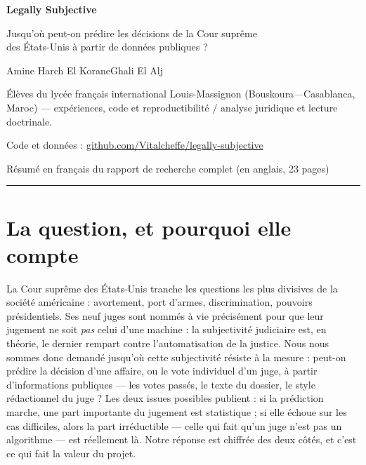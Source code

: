 \documentclass[11pt,a4paper]{article}
\begin{document}
\begin{center}
{\LARGE\bfseries Legally Subjective\par}
\vspace{4pt}
{\large Jusqu'où peut-on prédire les décisions de la Cour suprême\\
des États-Unis à partir de données publiques ?\par}
\vspace{10pt}
{\normalsize Amine Harch El Korane\quad Ghali El Alj\par}
\vspace{2pt}
{\small Élèves du lycée français international Louis-Massignon
(Bouskoura---Casablanca, Maroc) --- expériences, code et reproductibilité /
analyse juridique et lecture doctrinale.\par}
\vspace{2pt}
{\small Code et données : \href{https://github.com/Vitalcheffe/legally-subjective}{github.com/Vitalcheffe/legally-subjective}\par}
\vspace{4pt}
{\small Résumé en français du rapport de recherche complet (en anglais, 23 pages)\par}
\end{center}
\vspace{4pt}

\begin{center}
\rule{0.28\linewidth}{0.6pt}
\end{center}
\vspace{6pt}

\section*{La question, et pourquoi elle compte}

La Cour suprême des États-Unis tranche les questions les plus divisives de la
société américaine : avortement, port d'armes, discrimination, pouvoirs
présidentiels. Ses neuf juges sont nommés à vie précisément pour que leur
jugement ne soit \emph{pas} celui d'une machine : la subjectivité judiciaire
est, en théorie, le dernier rempart contre l'automatisation de la justice.
Nous nous sommes donc demandé jusqu'où cette subjectivité résiste à la
mesure : peut-on prédire la décision d'une affaire, ou le vote individuel
d'un juge, à partir d'informations publiques --- les votes passés, le texte
du dossier, le style rédactionnel du juge ? Les deux issues possibles
publient : si la prédiction marche, une part importante du jugement est
statistique ; si elle échoue sur les cas difficiles, alors la part
irréductible --- celle qui fait qu'un juge n'est pas un algorithme --- est
réellement là. Notre réponse est chiffrée des deux côtés, et c'est ce qui
fait la valeur du projet.
\end{document}
